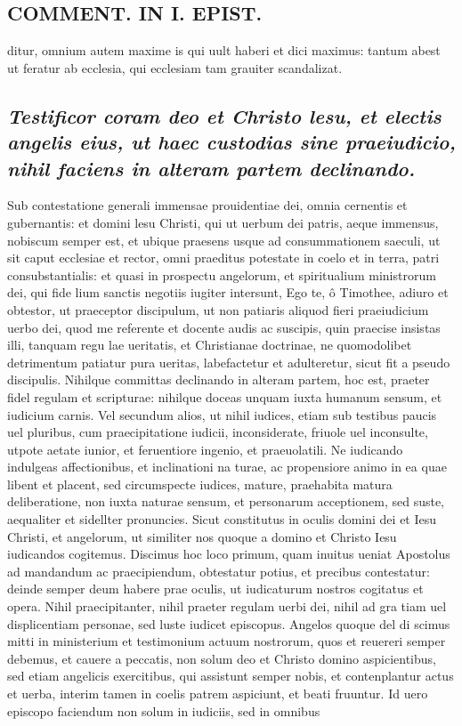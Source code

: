 \documentclass{article}
\begin{document}
\begin{pages}
\section*{COMMENT. IN I. EPIST. }
\marginpar{[ p.526 ]}\pstart ditur, omnium autem maxime is qui uult haberi et dici maximus: tantum abest ut feratur ab ecclesia, qui ecclesiam tam grauiter scandalizat.  \pend
{}
{}
\subsection*{\textit{Testificor coram deo et Christo lesu, et electis angelis eius, ut haec custodias sine praeiudicio, nihil faciens in alteram partem declinando. }}\pstart Sub contestatione generali immensae prouidentiae dei, omnia cernentis et gubernantis: et domini lesu Christi, qui ut uerbum dei patris, aeque immensus, nobiscum semper est, et ubique praesens usque ad consummationem saeculi, ut sit caput ecclesiae et rector, omni praeditus potestate in coelo et in terra, patri consubstantialis: et quasi in prospectu angelorum, et spiritualium ministrorum dei, qui fide lium sanctis negotiis iugiter intersunt, Ego te, ô Timothee, adiuro et obtestor, ut praeceptor discipulum, ut non patiaris aliquod fieri praeiudicium uerbo dei, quod me referente et docente audis ac suscipis, quin praecise insistas illi, tanquam regu lae ueritatis, et Christianae doctrinae, ne quomodolibet detrimentum patiatur pura ueritas, labefactetur et adulteretur, sicut fit a pseudo discipulis. Nihilque committas declinando in alteram partem, hoc est, praeter fidel regulam et scripturae: nihilque doceas unquam iuxta humanum sensum, et iudicium carnis. Vel secundum alios, ut nihil iudices, etiam sub testibus paucis uel pluribus, cum praecipitatione iudicii, inconsiderate, friuole uel inconsulte, utpote aetate iunior, et feruentiore ingenio, et praeuolatili. Ne iudicando indulgeas affectionibus, et inclinationi na turae, ac propensiore animo in ea quae libent et placent, sed circumspecte iudices, mature, praehabita matura deliberatione, non iuxta naturae sensum, et personarum acceptionem, sed suste, aequaliter et sidellter pronuncies. Sicut constitutus in oculis domini dei et Iesu Christi, et angelorum, ut similiter nos quoque a domino et Christo Iesu iudicandos cogitemus. Discimus hoc loco primum, quam inuitus ueniat Apostolus ad mandandum ac praecipiendum, obtestatur potius, et precibus contestatur: deinde semper deum habere prae oculis, ut iudicaturum nostros cogitatus et opera. Nihil praecipitanter, nihil praeter regulam uerbi dei, nihil ad gra tiam uel displicentiam personae, sed luste iudicet episcopus. Angelos quoque del di scimus mitti in ministerium et testimonium actuum nostrorum, quos et reuereri semper debemus, et cauere a peccatis, non solum deo et Christo domino aspicientibus, sed etiam angelicis exercitibus, qui assistunt semper nobis, et contenplantur actus et uerba, interim tamen in coelis patrem aspiciunt, et beati fruuntur. Id uero episcopo faciendum non solum in iudiciis, sed in omnibus 
\end{pages}
\end{document}
